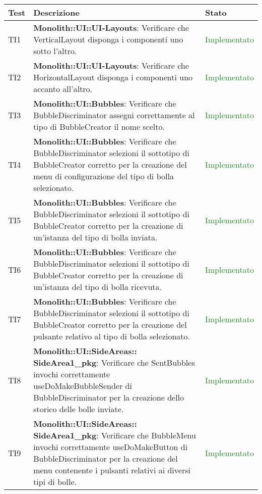 \begin{center}
\begin{longtable}{|
*{1}{>{\centering\arraybackslash}p{1cm}|}
*{1}{>{\centering\arraybackslash}p{7cm}|}
*{1}{>{\centering\arraybackslash}p{3cm}|}}
\hline \textbf{Test} & \textbf{Descrizione} & \textbf{Stato}\\
\hline \endhead

TI1 & \textbf{Monolith::UI::UI-Layouts}: Verificare che VerticalLayout disponga i componenti uno sotto l'altro. & \textcolor{ForestGreen}{Implementato}\\
 \hline 
TI2 & \textbf{Monolith::UI::UI-Layouts}: Verificare che HorizontalLayout disponga i componenti uno accanto all'altro. & \textcolor{ForestGreen}{Implementato}\\
 \hline 
TI3 & \textbf{Monolith::UI::Bubbles}: Verificare che BubbleDiscriminator assegni correttamente al tipo di BubbleCreator il nome scelto. & \textcolor{ForestGreen}{Implementato}\\
 \hline 
TI4 & \textbf{Monolith::UI::Bubbles}: Verificare che BubbleDiscriminator selezioni il sottotipo di BubbleCreator corretto per la creazione del menu di configurazione del tipo di bolla selezionato. & \textcolor{ForestGreen}{Implementato}\\
 \hline 
TI5 & \textbf{Monolith::UI::Bubbles}: Verificare che BubbleDiscriminator selezioni il sottotipo di BubbleCreator corretto per la creazione di un'istanza del tipo di bolla inviata. & \textcolor{ForestGreen}{Implementato}\\
 \hline 
TI6 & \textbf{Monolith::UI::Bubbles}: Verificare che BubbleDiscriminator selezioni il sottotipo di BubbleCreator corretto per la creazione di un'istanza del tipo di bolla ricevuta. & \textcolor{ForestGreen}{Implementato}\\
 \hline 
TI7 & \textbf{Monolith::UI::Bubbles}: Verificare che BubbleDiscriminator selezioni il sottotipo di BubbleCreator corretto per la creazione del pulsante relativo al tipo di bolla selezionato. & \textcolor{ForestGreen}{Implementato}\\
 \hline 
TI8 & \textbf{Monolith::UI::SideAreas:: SideArea1\_pkg}: Verificare che SentBubbles invochi correttamente useDoMakeBubbleSender di BubbleDiscriminator per la creazione dello storico delle bolle inviate. & \textcolor{ForestGreen}{Implementato}\\
 \hline 
TI9 & \textbf{Monolith::UI::SideAreas:: SideArea1\_pkg}: Verificare che BubbleMenu invochi correttamente useDoMakeButton di BubbleDiscriminator per la creazione del menu contenente i pulsanti relativi ai diversi tipi di bolle. & \textcolor{ForestGreen}{Implementato}\\

\end{longtable}
\end{center}
